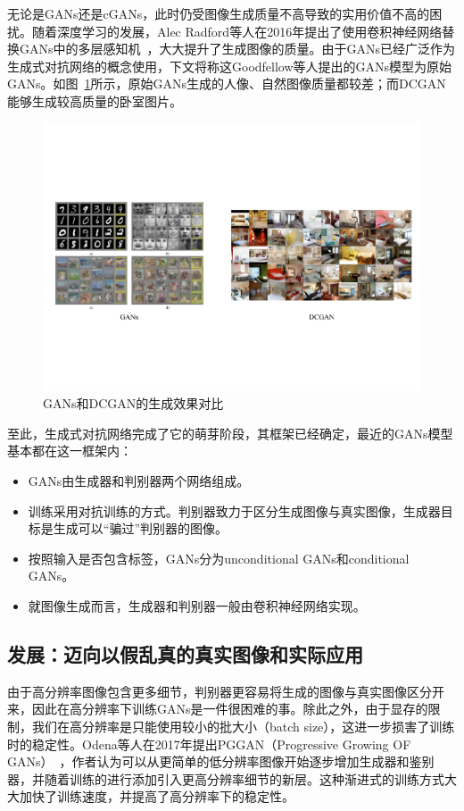 无论是GANs还是cGANs，此时仍受图像生成质量不高导致的实用价值不高的困扰。随着深度学习的发展，Alec Radford等人在2016年提出了使用卷积神经网络替换GANs中的多层感知机~\cite{DCGAN}，大大提升了生成图像的质量。由于GANs已经广泛作为生成式对抗网络的概念使用，下文将称这Goodfellow等人提出的GANs模型为原始GANs。如图~\ref{GAN-DCGAN}所示，原始GANs生成的人像、自然图像质量都较差；而DCGAN能够生成较高质量的卧室图片。

\begin{figure}
    \centering
    \includegraphics[width=\textwidth]{figures/GAN-DCGAN.pdf}
    \caption{GANs和DCGAN的生成效果对比}
    \label{GAN-DCGAN}
\end{figure}

至此，生成式对抗网络完成了它的萌芽阶段，其框架已经确定，最近的GANs模型基本都在这一框架内：

\begin{itemize}
\item GANs由生成器和判别器两个网络组成。
\item 训练采用对抗训练的方式。判别器致力于区分生成图像与真实图像，生成器目标是生成可以“骗过”判别器的图像。
\item 按照输入是否包含标签，GANs分为unconditional GANs和conditional GANs。
\item 就图像生成而言，生成器和判别器一般由卷积神经网络实现。
\end{itemize}

\subsection{发展：迈向以假乱真的真实图像和实际应用}
由于高分辨率图像包含更多细节，判别器更容易将生成的图像与真实图像区分开来，因此在高分辨率下训练GANs是一件很困难的事。除此之外，由于显存的限制，我们在高分辨率是只能使用较小的批大小（batch size），这进一步损害了训练时的稳定性。Odena等人在2017年提出PGGAN（Progressive Growing OF GANs）~\cite{PGGAN}，作者认为可以从更简单的低分辨率图像开始逐步增加生成器和鉴别器，并随着训练的进行添加引入更高分辨率细节的新层。这种渐进式的训练方式大大加快了训练速度，并提高了高分辨率下的稳定性。

